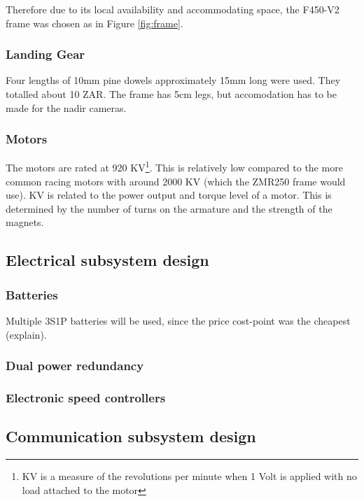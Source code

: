 Therefore due to its local availability and accommodating space, the F450-V2 frame was chosen as in Figure \ref{fig:frame}.

\subsubsection{Landing Gear}

Four lengths of 10mm pine dowels approximately 15mm long were used. They totalled about 10 ZAR. The frame has 5cm legs, but accomodation has to be made for the nadir cameras.

\subsubsection{Motors}

The motors are rated at 920 KV\footnote{KV is a measure of the revolutions per minute when 1 Volt is applied with no load attached to the motor}. This is relatively low compared to the more common racing motors with around 2000 KV (which the ZMR250 frame would use). KV is related to the power output and torque level of a motor. This is determined by the number of turns on the armature and the strength of the magnets.

\subsection{Electrical subsystem design}
\subsubsection{Batteries}

Multiple 3S1P batteries will be used, since the price cost-point was the cheapest (explain).

\subsubsection{Dual power redundancy}



\subsubsection{Electronic speed controllers}



\subsection{Communication subsystem design}

